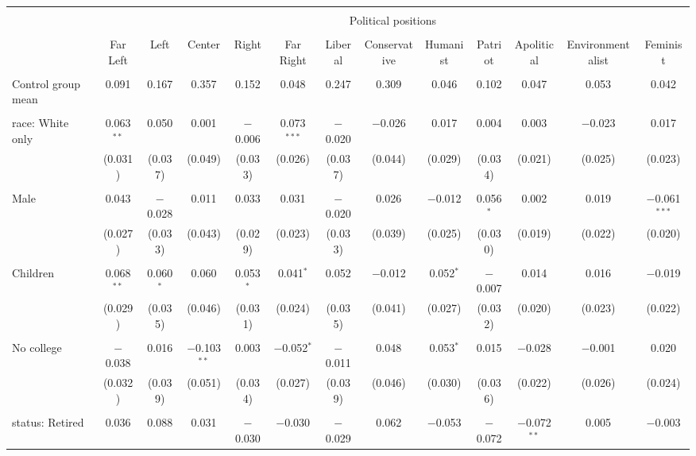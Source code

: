 
\begin{tabular}{@{\extracolsep{5pt}}lcccccccccccc} 
\\[-1.8ex]\hline 
\hline \\[-1.8ex] 
 & \multicolumn{12}{c}{Political positions} \\ 
\cline{2-13} 
\\[-1.8ex] & Far Left & Left & Center & Right & Far Right & Liberal & Conservative & Humanist & Patriot & Apolitical & Environmentalist & Feminist \\ 
\hline \\[-1.8ex] 
 Control group mean & 0.091 & 0.167 & 0.357 & 0.152 & 0.048 & 0.247 & 0.309 & 0.046 & 0.102 & 0.047 & 0.053 & 0.042  \\ \hline \\[-1.8ex] race: White only & 0.063$^{**}$ & 0.050 & 0.001 & $-$0.006 & 0.073$^{***}$ & $-$0.020 & $-$0.026 & 0.017 & 0.004 & 0.003 & $-$0.023 & 0.017 \\ 
  & (0.031) & (0.037) & (0.049) & (0.033) & (0.026) & (0.037) & (0.044) & (0.029) & (0.034) & (0.021) & (0.025) & (0.023) \\ 
  & & & & & & & & & & & & \\ 
 Male & 0.043 & $-$0.028 & 0.011 & 0.033 & 0.031 & $-$0.020 & 0.026 & $-$0.012 & 0.056$^{*}$ & 0.002 & 0.019 & $-$0.061$^{***}$ \\ 
  & (0.027) & (0.033) & (0.043) & (0.029) & (0.023) & (0.033) & (0.039) & (0.025) & (0.030) & (0.019) & (0.022) & (0.020) \\ 
  & & & & & & & & & & & & \\ 
 Children & 0.068$^{**}$ & 0.060$^{*}$ & 0.060 & 0.053$^{*}$ & 0.041$^{*}$ & 0.052 & $-$0.012 & 0.052$^{*}$ & $-$0.007 & 0.014 & 0.016 & $-$0.019 \\ 
  & (0.029) & (0.035) & (0.046) & (0.031) & (0.024) & (0.035) & (0.041) & (0.027) & (0.032) & (0.020) & (0.023) & (0.022) \\ 
  & & & & & & & & & & & & \\ 
 No college & $-$0.038 & 0.016 & $-$0.103$^{**}$ & 0.003 & $-$0.052$^{*}$ & $-$0.011 & 0.048 & 0.053$^{*}$ & 0.015 & $-$0.028 & $-$0.001 & 0.020 \\ 
  & (0.032) & (0.039) & (0.051) & (0.034) & (0.027) & (0.039) & (0.046) & (0.030) & (0.036) & (0.022) & (0.026) & (0.024) \\ 
  & & & & & & & & & & & & \\ 
 status: Retired & 0.036 & 0.088 & 0.031 & $-$0.030 & $-$0.030 & $-$0.029 & 0.062 & $-$0.053 & $-$0.072 & $-$0.072$^{**}$ & 0.005 & $-$0.003 \\ 

\end{tabular}
